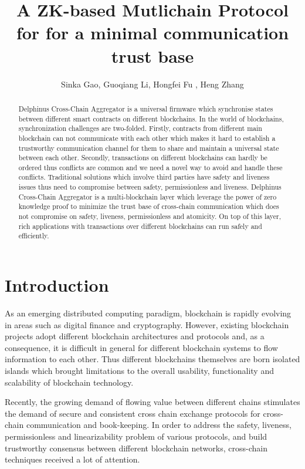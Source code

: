 \documentclass[pageno]{jpaper}
\begin{document}
\title{A ZK-based Mutlichain Protocol for for a minimal communication trust base}
\author{Sinka Gao, Guoqiang Li, Hongfei Fu , Heng Zhang}
\newcommand{\dprotocol}{Delphinus Cross-Chain Aggregator }
\date{}
\maketitle
\thispagestyle{empty}
\begin{abstract}
\dprotocol is a universal firmware which synchronise states between different smart contracts on different blockchains. In the world of blockchains, synchronization challenges are two-folded. Firstly, contracts from different main blockchain can not communicate with each other which makes it hard to establish a trustworthy communication channel for them to share and maintain a universal state between each other. Secondly, transactions on different blockchains can hardly be ordered thus conflicts are common and we need a novel way to avoid and handle these conflicts. Traditional solutions which involve third parties have safety and liveness issues thus need to compromise between safety, permissionless and liveness.  \dprotocol is a multi-blockchain layer which leverage the power of zero knowledge proof to minimize the trust base of cross-chain communication which does not compromise on safety, liveness, permissionless and atomicity. On top of this layer, rich applications with transactions over different blockchains can run safely and efficiently.
\end{abstract}

\section{Introduction}
As an emerging distributed computing paradigm, blockchain is rapidly evolving in areas such as digital finance and cryptography. However, existing blockchain projects adopt different blockchain architectures and protocols and, as a consequence, it is difficult in general for different blockchain systems to flow information to each other. Thus different blockchains themselves are born isolated islands which brought limitations to the overall usability, functionality and scalability of blockchain technology. \cite{anati2013innovative}

Recently, the growing demand of flowing value between different chains stimulates the demand of secure and consistent cross chain exchange protocols for cross-chain communication and book-keeping.  In order to address the safety, liveness, permissionless and linearizability problem of various protocols, and build trustworthy consensus between different blockchain networks, cross-chain techniques received a lot of attention.
\end{document}

